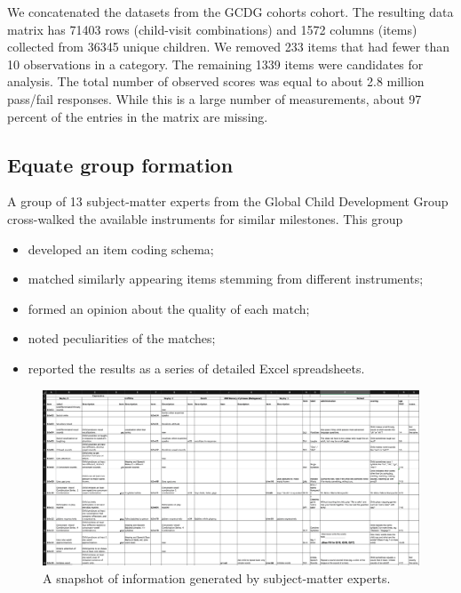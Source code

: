 \documentclass[
]{book}
\providecommand{\tightlist}{%
  \setlength{\itemsep}{0pt}\setlength{\parskip}{0pt}}
\begin{document}
We concatenated the datasets from the GCDG cohorts cohort. The resulting data matrix has 71403 rows (child-visit combinations) and 1572 columns (items) collected from 36345 unique children. We removed 233 items that had fewer than 10 observations in a category. The remaining 1339 items were candidates for analysis. The total number of observed scores was equal to about 2.8 million pass/fail responses. While this is a large number of measurements, about 97 percent of the entries in the matrix are missing.

\hypertarget{equate-group-formation}{%
\subsection{Equate group formation}\label{equate-group-formation}}

A group of 13 subject-matter experts from the Global Child Development Group cross-walked the available instruments for similar milestones. This group

\begin{itemize}
\tightlist
\item
  developed an item coding schema;
\item
  matched similarly appearing items stemming from different instruments;
\item
  formed an opinion about the quality of each match;
\item
  noted peculiarities of the matches;
\item
  reported the results as a series of detailed Excel spreadsheets.
\end{itemize}

\begin{figure}

{\centering \includegraphics[width=1\linewidth]{fig/equate_excel} 

}

\caption{A snapshot of information generated by subject-matter experts.}\label{fig:equatesheetpic}
\end{figure}
\end{document}
